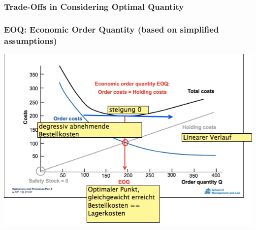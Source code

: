 \subsubsection{Trade-Offs in Considering Optimal Quantity}
\subsubsection{EOQ: Economic Order Quantity (based on simplified assumptions)}
\includegraphics[width=1\textwidth]{W10/EOQ-simplyfied}
